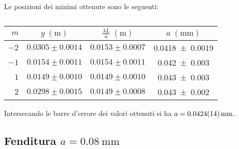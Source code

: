 \documentclass[../main.tex]{subfiles}
\begin{document}
Le posizioni dei minimi ottenute sono le seguenti:

\begin{table}[ht!]
    \centering
    \caption{}
    \begin{tabular}{r|cc|c}
        \toprule
        $m$  & $y \; (\si{\metre})$ & $\frac{\lambda L}{a} \; (\si{\metre})$ & $a \; (\si{\mm})$ \\
        \midrule
        $-2$ & $0.0305 \pm 0.0014$ & $0.0153 \pm 0.0007$ & \num{0.0418+-0.0019} \\
        $-1$ & $0.0154 \pm 0.0011$ & $0.0154 \pm 0.0011$ & \num{0.042+-0.003} \\
        $1$  & $0.0149 \pm 0.0010$ & $0.0149 \pm 0.0010$ & \num{0.043+-0.003} \\
        $2$  & $0.0298 \pm 0.0015$ & $0.0149 \pm 0.0008$ & \num{0.043+-0.002} \\
        \bottomrule
    \end{tabular}
    \label{tab:minimi 0.04}
\end{table}

Intersecando le barre d'errore dei valori ottenuti si ha $a = \qty{0.0424+-0.0014}{\mm}$.





\newpage

\subsection{Fenditura $a = \qty{0.08}{\milli\metre}$}

\end{document}
